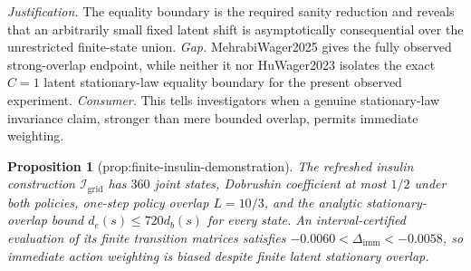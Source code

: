 \documentclass{article}
\newtheorem{proposition}{Proposition}
\begin{document}
\par\smallskip\noindent \textit{Justification.} The equality boundary is the required sanity reduction and reveals that an arbitrarily small fixed latent shift is asymptotically consequential over the unrestricted finite-state union. \textit{Gap.} MehrabiWager2025 gives the fully observed strong-overlap endpoint, while neither it nor HuWager2023 isolates the exact \(C=1\) latent stationary-law equality boundary for the present observed experiment. \textit{Consumer.} This tells investigators when a genuine stationary-law invariance claim, stronger than mere bounded overlap, permits immediate weighting.

\begin{proposition}[prop:finite-insulin-demonstration]\label{prop:finite-insulin-demonstration}
The refreshed insulin construction \(\mathcal I_{\mathrm{grid}}\) has \(360\) joint states, Dobrushin coefficient at most \(1/2\) under both policies, one-step policy overlap \(L=10/3\), and the analytic stationary-overlap bound \(d_e(s)\le720d_b(s)\) for every state. An interval-certified evaluation of its finite transition matrices satisfies \(-0.0060<\Delta_{\mathrm{imm}}<-0.0058\), so immediate action weighting is biased despite finite latent stationary overlap.
\end{proposition}
\end{document}
